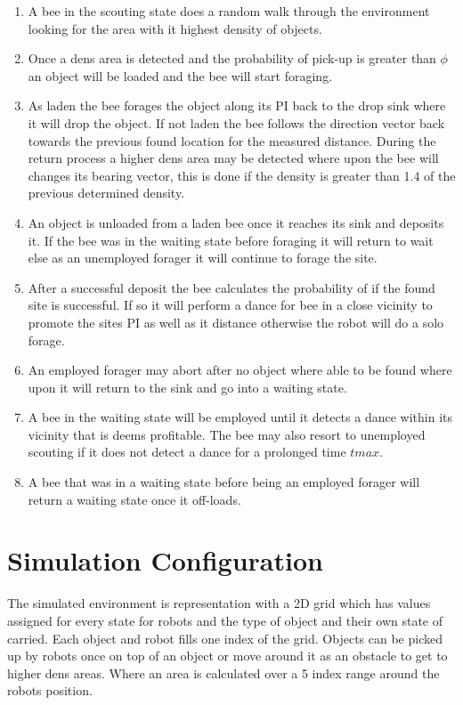 \documentclass[12pt]{article}
\begin{document}
\begin{enumerate}[nolistsep]
	\item A bee in the scouting state does a random walk through the environment looking for the area with it highest density of objects.
	\item Once a dens area is detected and the probability  of pick-up is greater than $\phi$ an object will be loaded and the bee will start foraging.
	\item As laden the bee forages the object along its PI back to the drop sink where it will drop the object. If not laden the bee follows the direction vector back towards the previous found location for the measured distance. During the return process a higher dens area may be detected where upon the bee will changes its bearing vector, this is done if the density is greater than 1.4 of the previous determined density.
	\item An object is unloaded from a laden bee once it reaches its sink and deposits it. If the bee was in the waiting state before foraging it will return to wait else as an unemployed forager it will continue to forage the site.
	\item After a successful deposit the bee calculates the probability of if the found site is successful. If so it will perform a dance for bee in a close vicinity to promote the sites PI as well as it distance otherwise the robot will do a solo forage.
	\item An employed forager may abort after no object where able to be found where upon it will return to the sink and go into a waiting state.
	\item A bee in the waiting state will be employed until it detects a dance within its vicinity that is deems profitable.  The bee may also resort to unemployed scouting if it does not detect a dance for a prolonged time $tmax$.
	\item A bee that was in a waiting state before being an employed forager will return a waiting state once it off-loads.
\end{enumerate}

\section{Simulation Configuration}

\par{The simulated environment is representation with a 2D grid which has values assigned for every state for robots and the type of object and their own state of carried. Each object and robot fills one index of the grid. Objects can be picked up by robots once on top of an object or move around it as an obstacle to get to higher dens areas. Where an area is calculated over a 5 index range around the robots position.}
\end{document}

